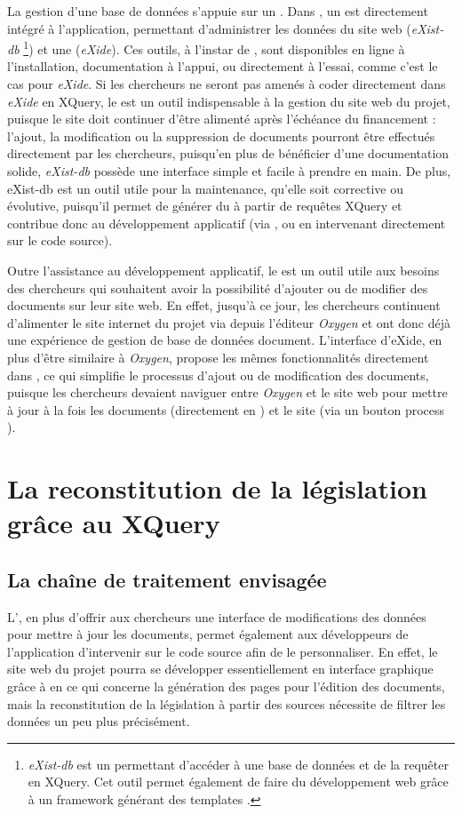 La gestion d'une base de données s'appuie sur un \SGBD. Dans \tp, un \SGBD est directement intégré à l'application, permettant d'administrer les données du site web (\textit{eXist-db} \footnote{\textit{eXist-db} est un \SGBD permettant d'accéder à une base de données et de la requêter en XQuery. Cet outil permet également de faire du développement web grâce à un framework générant des templates \HTML.}) et une \IDE (\textit{eXide}). Ces outils, à l'instar de \tp, sont disponibles en ligne à l'installation, documentation à l'appui, ou directement à l'essai, comme c'est le cas pour \textit{eXide}. Si les chercheurs ne seront pas amenés à coder directement dans \textit{eXide} en XQuery, le \SGBD est un outil indispensable à la gestion du site web du projet, puisque le site doit continuer d'être alimenté après l'échéance du financement : l'ajout, la modification ou la suppression de documents pourront être effectués directement par les chercheurs, puisqu'en plus de bénéficier d'une documentation solide, \textit{eXist-db} possède une interface simple et facile à prendre en main. De plus, eXist-db est un outil utile pour la maintenance, qu'elle soit corrective ou évolutive, puisqu'il permet de générer du \HTML à partir de requêtes XQuery et contribue donc au développement applicatif (via \tp, ou en intervenant directement sur le code source). 

Outre l'assistance au développement applicatif, le \SGBD est un outil utile aux besoins des chercheurs qui souhaitent avoir la possibilité d'ajouter ou de modifier des documents sur leur site web. En effet, jusqu'à ce jour, les chercheurs continuent d'alimenter le site internet du projet \LSC via \FTP depuis l'éditeur \XML \textit{Oxygen} et ont donc déjà une expérience de gestion de base de données document. L'interface d'eXide, en plus d'être similaire à \textit{Oxygen}, propose les mêmes fonctionnalités directement dans \tp, ce qui simplifie le processus d'ajout ou de modification des documents, puisque les chercheurs devaient naviguer entre \textit{Oxygen} et le site web \LSC pour mettre à jour à la fois les documents (directement en \XML) et le site (via un bouton \og process \XML \fg). 

 \section{La reconstitution de la législation grâce au XQuery}
    \subsection{La chaîne de traitement envisagée}
L'\IDE, en plus d'offrir aux chercheurs une interface de modifications des données \XML pour mettre à jour les documents, permet également aux développeurs de l'application d'intervenir sur le code source afin de le personnaliser. En effet, le site web du projet pourra se développer essentiellement en interface graphique grâce à \tp en ce qui concerne la génération des pages \HTML pour l'édition des documents, mais la reconstitution de la législation à partir des sources nécessite de filtrer les données un peu plus précisément. 

